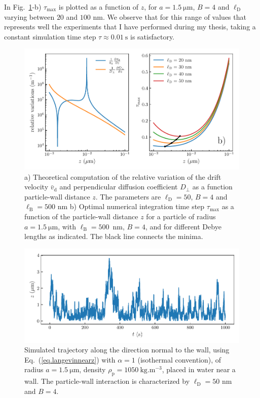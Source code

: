 In Fig.~\ref{fig.taumax}-b) $\tau_{\mathrm{max}}$ is plotted as a function of $z$, for $a=1.5 ~\mathrm{\mu m}$, $B = 4$ and $\ell _\mathrm{D}$ varying between $20$ and $100$ nm. We observe that for this range of values that represents well the experiments that I have performed during my thesis, taking a constant simulation time step $\tau \approx 0.01 ~ \mathrm{s}$ is satisfactory.


\begin{figure}[ht]
	\centering
	\includegraphics{02_body/chapter3/images/simulation_confined_Brownian_motion/maximal_tau.pdf}
	\caption{a) Theoretical computation of the relative variation of the drift velocity $\bar{v}_\mathrm{d}$ and perpendicular diffusion coefficient $D_\bot$ as a function particle-wall distance $z$. The parameters are $\ell_\mathrm{D}=50$, $B=4$ and $\ell_{\mathrm{B}} = 500$ nm b) Optimal numerical integration time step $\tau_\mathrm{max}$ as a function of the particle-wall distance $z$ for a particle of radius $a = 1.5 ~\mathrm{\mu m}$, with $\ell_{\textrm{B}}=500$~nm, $B = 4$, and for different Debye lengths as indicated. The black line connects the minima.} 
	\label{fig.taumax}
\end{figure}

\begin{figure}[H]
	\centering
	\includegraphics{02_body/chapter3/images/simulation_confined_Brownian_motion/z_traj_sim.pdf}
	\caption{Simulated trajectory along the direction normal to the wall, using Eq.~(\ref{eq.langevinnearz}) with $\alpha = 1$ (isothermal convention), of radius $a= 1.5  ~ \mathrm{\mu m}$, density $\rho_\mathrm{p} = 1050  ~\mathrm{kg.m^{-3}}$, placed in water near a wall. The particle-wall interaction is characterized by $\ell_\mathrm{D} = 50$ nm and $B=4$.} 
	\label{fig.z_traj_confined_simulated}
\end{figure}

